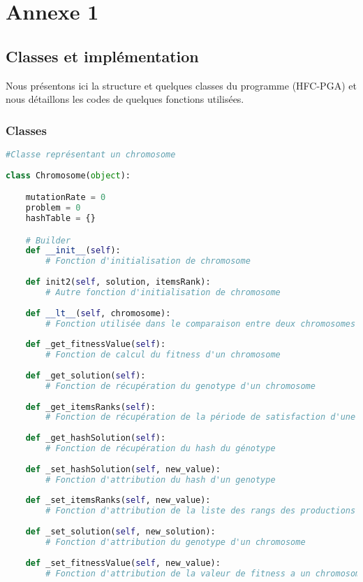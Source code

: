 \chapter{Annexe 1}

\section{Classes et implémentation}
	
	Nous présentons ici la structure et quelques classes du programme (HFC-PGA) et nous détaillons les codes de quelques fonctions utilisées.
	
	\subsection{Classes}
	
	\begin{lstlisting}[language=python]
	#Classe représentant un chromosome	
	
class Chromosome(object):

	mutationRate = 0
	problem = 0
	hashTable = {}

	# Builder 
	def __init__(self):
		# Fonction d'initialisation de chromosome
	
	def init2(self, solution, itemsRank):
		# Autre fonction d'initialisation de chromosome
	
	def __lt__(self, chromosome):
		# Fonction utilisée dans le comparaison entre deux chromosomes
	
	def _get_fitnessValue(self):
		# Fonction de calcul du fitness d'un chromosome
	
	def _get_solution(self):
		# Fonction de récupération du genotype d'un chromosome
	
	def _get_itemsRanks(self):
		# Fonction de récupération de la période de satisfaction d'une production
	
	def _get_hashSolution(self):
		# Fonction de récupération du hash du génotype
	
	def _set_hashSolution(self, new_value):
		# Fonction d'attribution du hash d'un genotype
	
	def _set_itemsRanks(self, new_value):
		# Fonction d'attribution de la liste des rangs des productions
	
	def _set_solution(self, new_solution):
		# Fonction d'attribution du genotype d'un chromosome
	
	def _set_fitnessValue(self, new_value):
		# Fonction d'attribution de la valeur de fitness a un chromosome
	

\end{lstlisting}

